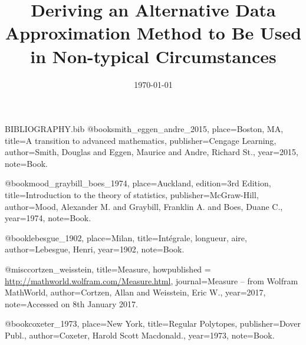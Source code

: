 \begin{filecontents}{BIBLIOGRAPHY.bib}
@book{smith_eggen_andre_2015,
 place={Boston, MA}, 
 title={A transition to advanced mathematics}, 
 publisher={Cengage Learning}, 
 author={Smith, Douglas and Eggen, Maurice and Andre, Richard St.}, 
 year={2015},
 note={Book.}}

@book{mood_graybill_boes_1974, 
 place={Auckland}, 
 edition={3rd Edition}, 
 title={Introduction to the theory of statistics}, 
 publisher={McGraw-Hill}, 
 author={Mood, Alexander M. and Graybill, Franklin A. and Boes, Duane C.}, 
 year={1974},
 note={Book.}}

@book{lebesgue_1902, 
 place={Milan}, 
 title={Intégrale, longueur, aire}, 
 author={Lebesgue, Henri}, 
 year={1902},
 note={Book.}}
 
@misc{cortzen_weisstein, 
 title={Measure}, 
 howpublished = {\url{http://mathworld.wolfram.com/Measure.html}}, 
 journal={Measure -- from Wolfram MathWorld}, 
 author={Cortzen, Allan and Weisstein, Eric W.},
 year={2017},
 note={Accessed on 8th January 2017.}}
 
@book{coxeter_1973, 
 place={New York}, 
 title={Regular Polytopes}, 
 publisher={Dover Publ.}, 
 author={Coxeter, Harold Scott Macdonald.}, 
 year={1973},
 note={Book.}}

\end{filecontents}
\documentclass[11pt,a4paper]{article}
\usepackage{graphicx}
\graphicspath{ {images/} }
\usepackage{url}
\usepackage{natbib}
\usepackage[rightcaption]{sidecap}
\usepackage{svg}
\usepackage{transparent}
\usepackage{xcolor}
\usepackage{relsize}
\usepackage{amsmath}
\usepackage{amsfonts}
\usepackage[margin=2cm]{geometry}
\usepackage{fancyhdr}
\usepackage{enumitem}
\pagestyle{fancy}
\usepackage{float}
\usepackage{cancel}
\usepackage{subfig}
\usepackage{multirow}
\usepackage{varioref}
\usepackage{mathtools}
\usepackage[utf8]{inputenc}





\fancyhf{}               
\fancyhead[L]{\rightmark}   
\fancyhead[C]{\thepage}


\title{Deriving an Alternative Data Approximation Method to Be Used in Non-typical  Circumstances}
\date{\today}

\newcommand{\vecc}{\vec{\textbf{c}}}


\begin{titlepage}
\begin{center}
IB Mathematics Higher Level Exploration on Statistics 
\\ 
\rule{\textwidth}{0.25pt}
\linebreak
\Huge{Deriving an Alternative Data Approximation Method to Be Used in Non-typical  Circumstances}
\rule{\textwidth}{0.25pt} \\
[15cm]
\large {Personal code: fzn106} \\

\end{center}
\end{titlepage}
\newpage
\tableofcontents
\newpage

